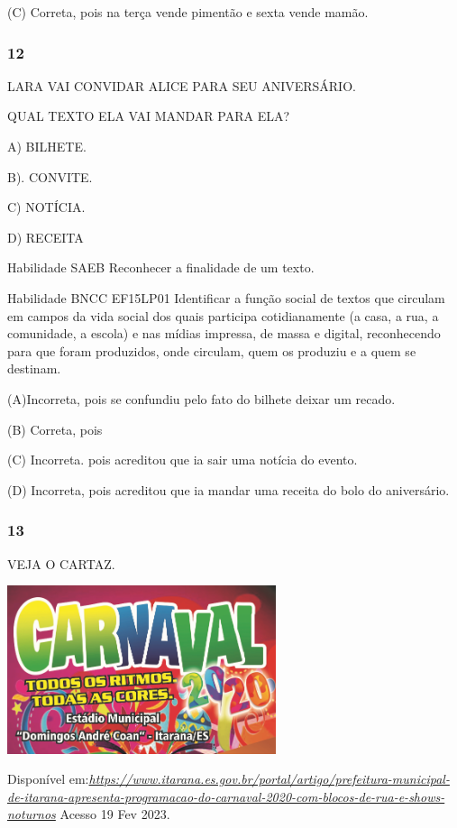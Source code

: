 (C) Correta, pois na terça vende pimentão e sexta vende mamão.

\subsubsection{12}\label{section-37}

LARA VAI CONVIDAR ALICE PARA SEU ANIVERSÁRIO.

QUAL TEXTO ELA VAI MANDAR PARA ELA?

A) BILHETE.

B). CONVITE.

C) NOTÍCIA.

D) RECEITA

Habilidade SAEB Reconhecer a finalidade de um texto.

Habilidade BNCC EF15LP01 Identificar a função social de textos que
circulam em campos da vida social dos quais participa cotidianamente (a
casa, a rua, a comunidade, a escola) e nas mídias impressa, de massa e
digital, reconhecendo para que foram produzidos, onde circulam, quem os
produziu e a quem se destinam.

(A)Incorreta, pois se confundiu pelo fato do bilhete deixar um recado.

(B) Correta, pois

(C) Incorreta. pois acreditou que ia sair uma notícia do evento.

(D) Incorreta, pois acreditou que ia mandar uma receita do bolo do
aniversário.\protect\hypertarget{_heading=h.s4vmdpjsaa88}{}{}

\subsubsection{13}\label{section-38}

VEJA O CARTAZ.

\includegraphics[width=3.10650in,height=1.94326in]{media/image204.png}

Disponível
em:\href{https://www.itarana.es.gov.br/portal/artigo/prefeitura-municipal-de-itarana-apresenta-programacao-do-carnaval-2020-com-blocos-de-rua-e-shows-noturnos}{\emph{https://www.itarana.es.gov.br/portal/artigo/prefeitura-municipal-de-itarana-apresenta-programacao-do-carnaval-2020-com-blocos-de-rua-e-shows-noturnos}}
Acesso 19 Fev 2023.

